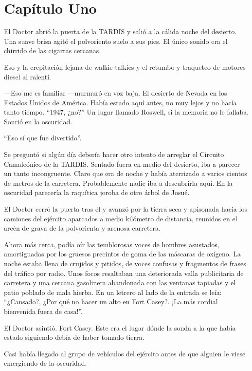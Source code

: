 \chapter*{Capítulo Uno}

El Doctor abrió la puerta de la TARDIS y salió a la cálida noche del
desierto. Una suave brisa agitó el polvoriento suelo a sus pies. El
único sonido era el chirrido de las cigarras cercanas.

Eso y la crepitación lejana de walkie-talkies y el retumbo y traqueteo
de motores diesel al ralentí.

---Eso me es familiar ---murmuró en voz baja. El desierto de Nevada en
los Estados Unidos de América. Había estado aquí antes, no muy lejos y
no hacía tanto tiempo. ``1947, ¿no?'' Un lugar llamado Roswell, si la
memoria no le fallaba. Sonrió en la oscuridad.

``Eso sí que fue divertido''.

Se preguntó si algún día debería hacer otro intento de arreglar el
Circuito Camaleónico de la TARDIS. Sentado fuera en medio del desierto,
iba a parecer un tanto incongruente. Claro que era de noche y había
aterrizado a varios cientos de metros de la carretera. Probablemente
nadie iba a descubrirla aquí. En la oscuridad parecería la raquítica
joroba de otro árbol de Josué.

El Doctor cerró la puerta tras él y avanzó por la tierra seca y
apisonada hacia los camiones del ejército aparcados a medio kilómetro de
distancia, reunidos en el arcén de grava de la polvorienta y arenosa
carretera.

Ahora más cerca, podía oír las temblorosas voces de hombres asustados,
amortiguadas por los gruesos precintos de goma de las máscaras de
oxígeno. La noche estaba llena de crujidos y pitidos, de voces confusas
y fragmentos de frases del tráfico por radio. Unos focos resaltaban una
deteriorada valla publicitaria de carretera y una cercana gasolinera
abandonada con las ventanas tapiadas y el patio poblado de mala hierba.
En un letrero al lado de la entrada se leía: ``¿Cansado?, ¿Por qué no
hacer un alto en Fort Casey?. ¡La más cordial bienvenida fuera de
casa!''.

El Doctor asintió. Fort Casey. Este era el lugar dónde la sonda a la que
había estado siguiendo debía de haber tomado tierra.

Casi había llegado al grupo de vehículos del ejército antes de que
alguien le viese emergiendo de la oscuridad.

